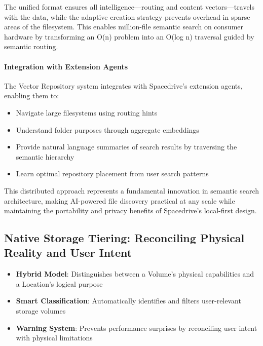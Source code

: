 \documentclass[sigconf]{acmart}
\begin{document}
The unified format ensures all intelligence—routing and content vectors—travels with the data, while the adaptive creation strategy prevents overhead in sparse areas of the filesystem. This enables million-file semantic search on consumer hardware by transforming an O(n) problem into an O(log n) traversal guided by semantic routing.

\paragraph{Integration with Extension Agents}
The Vector Repository system integrates with Spacedrive's extension agents, enabling them to:
\begin{itemize}
    \item Navigate large filesystems using routing hints
    \item Understand folder purposes through aggregate embeddings
    \item Provide natural language summaries of search results by traversing the semantic hierarchy
    \item Learn optimal repository placement from user search patterns
\end{itemize}

This distributed approach represents a fundamental innovation in semantic search architecture, making AI-powered file discovery practical at any scale while maintaining the portability and privacy benefits of Spacedrive's local-first design.


\subsection{Native Storage Tiering: Reconciling Physical Reality and User Intent}
\label{sec:volume-foundation}

\begin{keytakeaways}
\begin{itemize}[noitemsep, topsep=0pt]
\item \textbf{Hybrid Model}: Distinguishes between a Volume's physical capabilities and a Location's logical purpose
\item \textbf{Smart Classification}: Automatically identifies and filters user-relevant storage volumes
\item \textbf{Warning System}: Prevents performance surprises by reconciling user intent with physical limitations
\end{itemize}
\end{keytakeaways}
\end{document}
